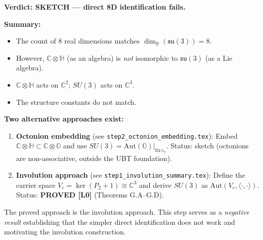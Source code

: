 \documentclass[12pt,a4paper]{article}
\theoremstyle{definition}
\theoremstyle{remark}
\begin{document}
\begin{resultbox}
\textbf{Verdict: SKETCH --- direct 8D identification fails.}

\textbf{Summary:}
\begin{itemize}
  \item The count of 8 real dimensions matches $\dim_\mathbb{R}(\mathfrak{su}(3)) = 8$.
  \item However, $\mathbb{C}\otimes\mathbb{H}$ (as an algebra) is \emph{not}
        isomorphic to $\mathfrak{su}(3)$ (as a Lie algebra).
  \item $\mathbb{C}\otimes\mathbb{H}$ acts on $\mathbb{C}^2$; $SU(3)$ acts on $\mathbb{C}^3$.
  \item The structure constants do not match.
\end{itemize}

\textbf{Two alternative approaches exist:}
\begin{enumerate}
  \item \textbf{Octonion embedding} (see \texttt{step2\_octonion\_embedding.tex}):
        Embed $\mathbb{C}\otimes\mathbb{H} \subset \mathbb{C}\otimes\mathbb{O}$ and
        use $SU(3) = \mathrm{Aut}(\mathbb{O})|_{\mathrm{fix\,}e_7}$.
        Status: sketch (octonions are non-associative, outside the UBT foundation).
  \item \textbf{Involution approach} (see \texttt{step1\_involution\_summary.tex}):
        Define the carrier space $V_c = \ker(P_2 + 1) \cong \mathbb{C}^3$ and
        derive $SU(3)$ as $\mathrm{Aut}(V_c, \langle\cdot,\cdot\rangle)$.
        Status: \textbf{PROVED [L0]} (Theorems G.A--G.D).
\end{enumerate}

The proved approach is the involution approach.  This step serves as a
\emph{negative result} establishing that the simpler direct identification
does not work and motivating the involution construction.
\end{resultbox}

\ifdefined\INCLUDEMODE
\else
  
\end{document}
